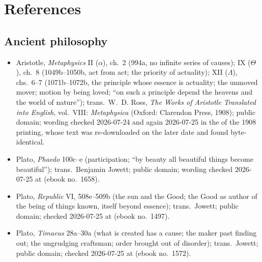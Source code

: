 \section{References}

\begingroup
\setlength{\parskip}{0pt}
\titlespacing*{\subsection}{0pt}{1.0ex}{0.3ex}

\subsection*{Ancient philosophy}

{\fontsize{8.6}{9.6}\selectfont
\begin{itemize}[itemsep=0pt,parsep=0pt,topsep=0.05em]
\item Aristotle, \emph{Metaphysics} II ($\alpha$), ch.~2 (994a, no infinite series of causes); IX ($\Theta$), ch.~8 (1049b--1050b, act from act; the priority of actuality); XII ($\Lambda$), chs.~6--7 (1071b--1072b, the principle whose essence is actuality; the unmoved mover; motion by being loved; ``on such a principle depend the heavens and the world of nature''); trans.\ W.~D. Ross, \emph{The Works of Aristotle Translated into English}, vol.~VIII: \emph{Metaphysica} (Oxford: Clarendon Press, 1908); public domain; wording checked 2026-07-24 and again 2026-07-25 in the  of the 1908 printing, whose text was re-downloaded on the later date and found byte-identical.
\item Plato, \emph{Phaedo} 100c--e (participation; ``by beauty all beautiful things become beautiful''); trans.\ Benjamin Jowett; public domain; wording checked 2026-07-25 at  (ebook no.~1658).
\item Plato, \emph{Republic} VI, 508e--509b (the sun and the Good; the Good as author of the being of things known, itself beyond essence); trans.\ Jowett; public domain; checked 2026-07-25 at  (ebook no.~1497).
\item Plato, \emph{Timaeus} 28a--30a (what is created has a cause; the maker past finding out; the ungrudging craftsman; order brought out of disorder); trans.\ Jowett; public domain; checked 2026-07-25 at  (ebook no.~1572).
\end{itemize}}


